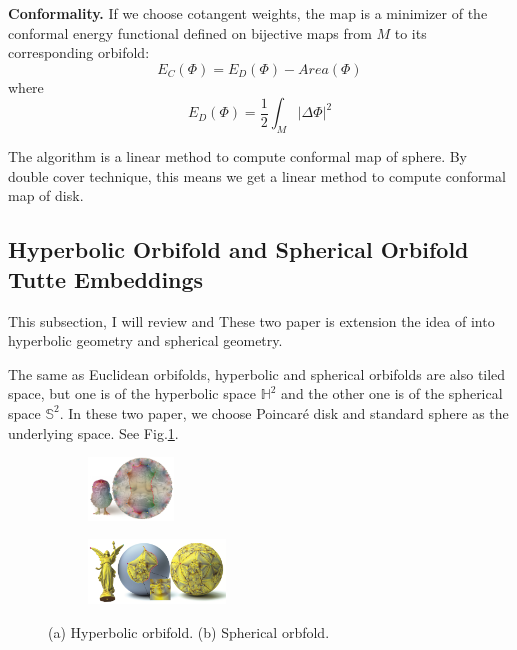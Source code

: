 \documentclass[fleqn,10pt]{wlscirep}
\begin{document}
\textbf{Conformality.} 
If we choose cotangent weights, the map is a minimizer of the conformal energy functional defined on bijective maps from $M$ to its corresponding orbifold:
$$ E_C(\Phi) = E_D(\Phi) - Area(\Phi)$$
where $$E_D(\Phi) = \frac{1}{2}\int_M |\Delta \Phi|^2 $$

The algorithm is a linear method to compute conformal map of sphere. By double cover technique, this means we get a linear method to compute conformal map of disk.


\subsection{Hyperbolic Orbifold and Spherical Orbifold Tutte Embeddings}

This subsection, I will review \cite{Aigerman:2016:HOT:2980179.2982412} and \cite{Aigerman:2017:SOT:3072959.3073615}
These two paper is extension the idea of \cite{Aigerman:2015:OTE:2816795.2818099} into hyperbolic geometry and spherical geometry.

The same as Euclidean orbifolds, hyperbolic and spherical orbifolds are also tiled space, but one is of the hyperbolic space $\mathbb{H}^2$ and the other one is of the spherical space $\mathbb{S}^2$. In these two paper, we choose  Poincar\'e disk and standard sphere as the underlying space. See Fig.\ref{fig:hs}.

\begin{figure}
\begin{subfigure}[b]{\textwidth}
\centering
\includegraphics[width = 0.25\textwidth]{images/hyperbolic}
\caption{}
\end{subfigure}
\begin{subfigure}[b]{\textwidth}
\centering
\includegraphics[width = 0.4\textwidth]{images/spherical}
\caption{}
\end{subfigure}
\caption{(a) Hyperbolic orbifold.  (b) Spherical orbfold.}
\label{fig:hs}
\end{figure}
\end{document}
